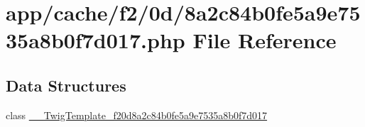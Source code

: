 \hypertarget{8a2c84b0fe5a9e7535a8b0f7d017_8php}{\section{app/cache/f2/0d/8a2c84b0fe5a9e7535a8b0f7d017.php File Reference}
\label{8a2c84b0fe5a9e7535a8b0f7d017_8php}
}
\subsection*{Data Structures}
\begin{DoxyCompactItemize}
\item 
class \hyperlink{class_____twig_template__f20d8a2c84b0fe5a9e7535a8b0f7d017}{\-\_\-\-\_\-\-Twig\-Template\-\_\-f20d8a2c84b0fe5a9e7535a8b0f7d017}
\end{DoxyCompactItemize}
